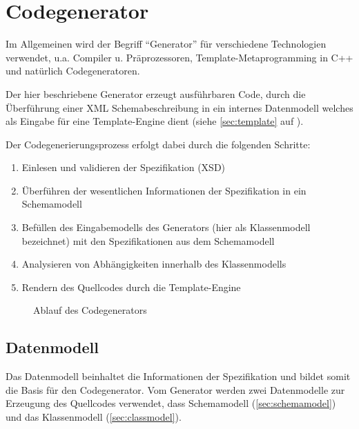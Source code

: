 \section{Codegenerator}


Im Allgemeinen wird der Begriff \enquote{Generator} für verschiedene Technologien verwendet, u.a. Compiler u. Präprozessoren, Template-Metaprogramming in C++ und natürlich Codegeneratoren.

Der hier beschriebene Generator erzeugt ausführbaren Code, durch die Überführung einer XML Schemabeschreibung in ein internes Datenmodell welches als Eingabe für eine Template-Engine dient (siehe \cref{sec:template} auf \pageref{sec:template}).

Der Codegenerierungsprozess erfolgt dabei durch die folgenden Schritte:

\begin{enumerate}
    \item Einlesen und validieren der Spezifikation (\gls{XSD})
    \item Überführen der wesentlichen Informationen der Spezifikation in ein Schemamodell
    \item Befüllen des Eingabemodells des Generators (hier als Klassenmodell bezeichnet) mit den Spezifikationen aus dem Schemamodell
    \item Analysieren von Abhängigkeiten innerhalb des Klassenmodells
    \item Rendern des Quellcodes durch die Template-Engine
\end{enumerate}

\begin{figure}[h]
    \centering
    \resizebox{!}{0.8\textwidth}{
        
    }
    \caption{Ablauf des Codegenerators}
    \label{fig:flow}
\end{figure}

\subsection{Datenmodell}

Das Datenmodell beinhaltet die Informationen der Spezifikation und bildet somit die Basis für den Codegenerator.
Vom Generator werden zwei Datenmodelle zur Erzeugung des Quellcodes verwendet, dass Schemamodell (\cref{sec:schemamodel}) und das Klassenmodell (\cref{sec:classmodel}).

